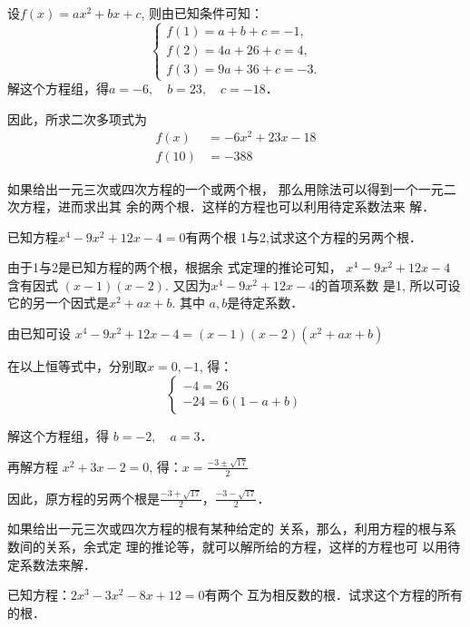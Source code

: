 \begin{solution}
    设$f(x)=ax^2+bx+c$,
则由已知条件可知：
\[\begin{cases}
    f(1)=a+b+c=-1,\\
f(2)=4a+26+c=4,\\
f(3)=9a+36+c=-3.
\end{cases}\]
解这个方程组，得$a=-6,\quad b=23,\quad c=-18$．

因此，所求二次多项式为
\[\begin{split}
    f(x)&=-6x^2+23x-18\\
f(10)&=-388
\end{split}\]
\end{solution}

如果给出一元三次或四次方程的一个或两个根，
那么用除法可以得到一个一元二次方程，进而求出其
余的两个根．这样的方程也可以利用待定系数法来
解．


\begin{example}
   已知方程$x^4-9x^2+12x-4=0$有两个根
1与2,试求这个方程的另两个根． 
\end{example}

\begin{analyze}
由于1与2是已知方程的两个根，根据余
式定理的推论可知，
$x^4-9x^2+12x-4$
含有因式
$(x-1)(x-2)$. 又因为$x^4-9x^2+12x-4$的首项系数
是1, 所以可设它的另一个因式是$x^2+ax+b$. 其中
$a,b$是待定系数．
\end{analyze}

\begin{solution}
    由已知可设
$x^4-9x^2+12x-4=(x-1)(x-2)(x^2+ax+b)$

在以上恒等式中，分别取$x=0,-1$, 得：
\[\begin{cases}
    -4=26\\
-24=6(1-a+b)
\end{cases}\]

解这个方程组，得 $b=-2,\quad a=3$．

再解方程 $x^2+3x-2=0$, 得：$x=\frac{-3\pm\sqrt{17}}{2}$

因此，原方程的另两个根是$\frac{-3+\sqrt{17}}{2}$，$\frac{-3-\sqrt{17}}{2}$．
\end{solution}

如果给出一元三次或四次方程的根有某种给定的
关系，那么，利用方程的根与系数间的关系，余式定
理的推论等，就可以解所给的方程，这样的方程也可
以用待定系数法来解．    

\begin{example}
    已知方程：$2x^3-3x^2-8x+12=0$有两个
互为相反数的根．试求这个方程的所有的根．
\end{example}

